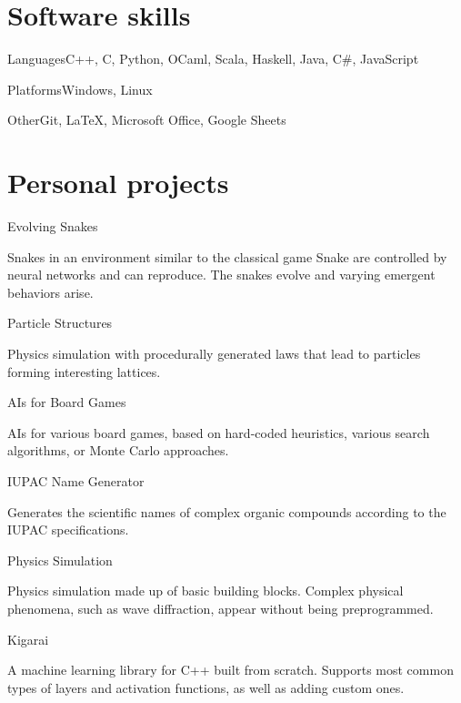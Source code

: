 \documentclass{tccv}
\begin{document}
\section{Software skills}

\begin{factlist}

\item{Languages}{C++, C, Python, OCaml, Scala, Haskell, Java, C\#, JavaScript}
\item{Platforms}{Windows, Linux}
\item{Other}{Git, \LaTeX, Microsoft Office, Google Sheets}

\end{factlist}

\newpage


\section{Personal projects}

\begin{projectlist}

\item{Evolving Snakes}

Snakes in an environment similar to the classical game Snake are controlled by neural networks and can reproduce.
The snakes evolve and varying emergent behaviors arise.

\item{Particle Structures}

Physics simulation with procedurally generated laws that lead to particles
forming interesting lattices.

\item{AIs for Board Games}

AIs for various board games, based on hard-coded heuristics, various search algorithms, or Monte Carlo approaches.

\item{IUPAC Name Generator}

Generates the scientific names of complex organic compounds according to the IUPAC specifications.

\item{Physics Simulation}

Physics simulation made up of basic building blocks.
Complex physical phenomena, such as wave diffraction, appear without being preprogrammed.

\item{Kigarai}

A machine learning library for C++ built from scratch.
Supports most common types of layers and activation functions, as well as adding custom ones.

\end{projectlist}
\end{document}
